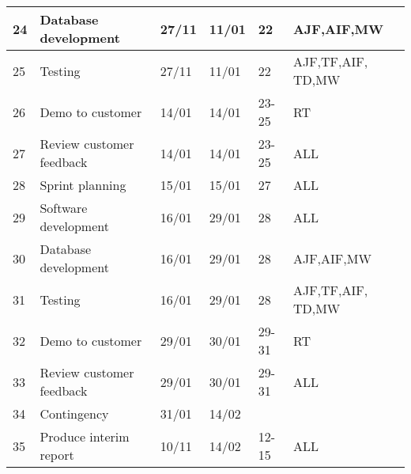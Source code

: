 \begin{longtable}{ | l | l | l | l | l | l | }
24 & Database development & 27/11 & 11/01 & 22 & AJF,AIF,MW \\ \hline
25 & Testing & 27/11 & 11/01 & 22 & AJF,TF,AIF, TD,MW \\ \hline
26 & Demo to customer & 14/01 & 14/01 & 23-25 & RT \\ \hline
27 & Review customer feedback & 14/01 & 14/01 & 23-25 & ALL \\ \hline
\hline
28 & Sprint planning & 15/01 & 15/01 & 27 & ALL \\ \hline
29 & Software development & 16/01 & 29/01 & 28 & ALL \\ \hline
30 & Database development & 16/01 & 29/01 & 28 & AJF,AIF,MW \\ \hline
31 & Testing & 16/01 & 29/01 & 28 & AJF,TF,AIF, TD,MW \\ \hline
32 & Demo to customer & 29/01 & 30/01 & 29-31 & RT \\ \hline
33 & Review customer feedback & 29/01 & 30/01 & 29-31 & ALL \\ \hline
\hline
34 & Contingency & 31/01 & 14/02 & & \\ \hline
35 & Produce interim report & 10/11 & 14/02 & 12-15 & ALL \\ \hline
\end{longtable}
